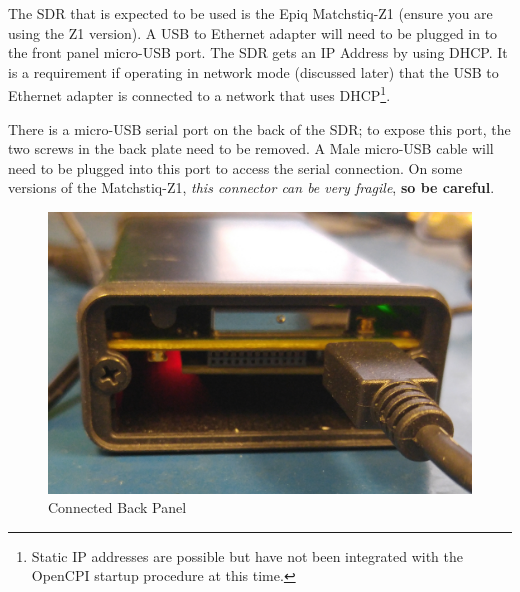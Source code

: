 \begin{flushleft}
The SDR that is expected to be used is the Epiq Matchstiq-Z1 (ensure you are using the Z1 version).  A USB to Ethernet adapter will need to be plugged in to the front panel micro-USB port.  The SDR gets an IP Address by using DHCP.  It is a requirement if operating in network mode (discussed later) that the USB to Ethernet adapter is connected to a network that uses DHCP\footnote{Static IP addresses are possible but have not been integrated with the OpenCPI startup procedure at this time.}. \\ \bigskip

There is a micro-USB serial port on the back of the SDR; to expose this port, the two screws in the back plate need to be removed.  A Male micro-USB cable will need to be plugged into this port to access the serial connection.  On some versions of the Matchstiq-Z1, \textit{this connector can be very fragile}, \textbf{so be careful}.\\ \bigskip

\begin{figure}[ht]
	\centerline{\includegraphics[scale=0.08]{Matchstiq_Z1_backpannel}}
	\caption{Connected Back Panel}
	\label{fig:back}
\end{figure}


\end{flushleft}
